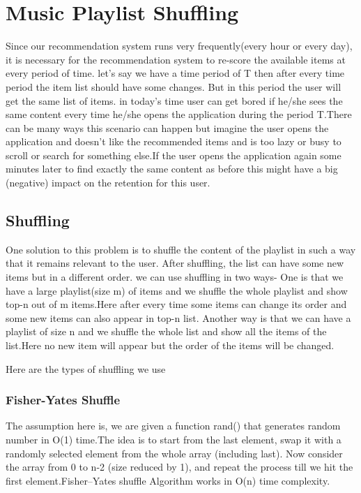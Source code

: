\chapter{Music Playlist Shuffling}\label{final}
Since our recommendation system runs very frequently(every hour or every day), it is necessary for the recommendation system to re-score the available items at every period of time. let's say we have a time period of T then after every time period the item list should have some changes. But in this period the user will get the same list of items. in today's time user can get bored if he/she sees the same content every time he/she opens the application during the period T.There can be many ways this scenario can happen but imagine the user opens the application and doesn't like the recommended items and is too lazy or busy to scroll or search for something else.If the user opens the application again some minutes later to find exactly the same content as before this might have a big (negative) impact on the retention for this user.

\section{Shuffling}
One solution to this problem is to shuffle the content of the playlist in such a way that it remains
relevant to the user. After shuffling, the list can have some new items but in a different order.
we can use shuffling in two ways- One is that we have a large playlist(size m) of items and we shuffle the whole playlist and show top-n out of m items.Here after every time some items can change its order and some new items can also appear in top-n list. Another way is that we can have a playlist of size n and we shuffle the whole list and show all the items of the list.Here no new item will appear but the order of the items will be changed.

Here are the types of shuffling we use

\subsection{Fisher-Yates Shuffle}

The assumption here is, we are given a function rand() that generates random number in O(1) time.The idea is to start from the last element, swap it with a randomly selected element from the whole array (including last). Now consider the array from 0 to n-2 (size reduced by 1), and repeat the process till we hit the first element.Fisher–Yates shuffle Algorithm works in O(n) time complexity.


